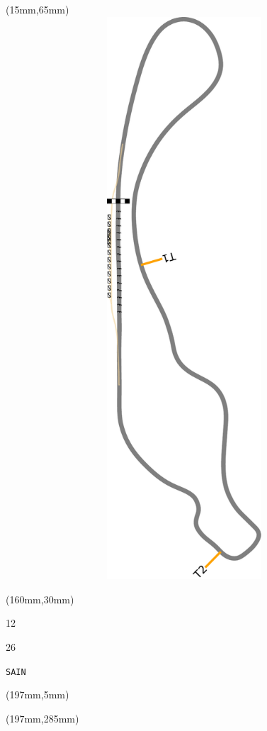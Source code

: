 \begin{textblock*}{185mm}(15mm,65mm)%
\centering
\mbox{\includegraphics[width=185mm,height=210mm,keepaspectratio]{PT/SAIN.pdf}}
\end{textblock*}
\begin{textblock*}{40mm}(160mm,30mm)%
\Large
\par{} 
\par12 
\par26 
\par\hfill\tiny\tt SAIN\\
\end{textblock*}
\begin{textblock*}{20mm}(197mm,5mm)%
\fbox{\thepage}
\label{SAIN}
\end{textblock*}
\begin{textblock*}{20mm}(197mm,285mm)%
\fbox{\thepage}
\end{textblock*}

